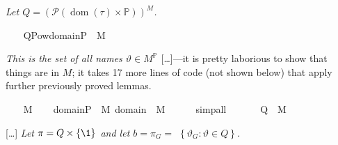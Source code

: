 \textit{Let
  $Q=(\mathcal{P}(\operatorname{dom}(\tau) \times
  \mathbb{P}))^{M}$.}
\begin{isabelle}
\ \ \isamarkupfalse%
\ {\isacharquery}{\kern0pt}Q{\isacharequal}{\kern0pt}{\isachardoublequoteopen}Pow{\isacharparenleft}{\kern0pt}domain{\isacharparenleft}{\kern0pt}{\isasymtau}{\isacharparenright}{\kern0pt}{\isasymtimes}P{\isacharparenright}{\kern0pt}\ {\isasyminter}\ M{\isachardoublequoteclose}
\end{isabelle}
\textit{This is the set of all names $\vartheta \in
  M^{\mathbb{P}}$} [\dots]---it is pretty laborious to show that things
are in $M$; it takes 17 more lines of code (not shown below) that
apply further previously proved lemmas.
\begin{isabelle}
\ \ \isamarkupfalse%
\ {\isacartoucheopen}{\isasymtau}{\isasymin}M{\isacartoucheclose}\isanewline
\ \ \isamarkupfalse%
\ {\isachardoublequoteopen}domain{\isacharparenleft}{\kern0pt}{\isasymtau}{\isacharparenright}{\kern0pt}{\isasymtimes}P\ {\isasymin}\ M{\isachardoublequoteclose}\ {\isachardoublequoteopen}domain{\isacharparenleft}{\kern0pt}{\isasymtau}{\isacharparenright}{\kern0pt}\ {\isasymin}\ M{\isachardoublequoteclose}\isanewline
\ \ \ \ \isamarkupfalse%
\ simp{\isacharunderscore}{\kern0pt}all\isanewline
\ \ \isamarkupfalse%
\isanewline
\ \ \isamarkupfalse%
\ {\isachardoublequoteopen}{\isacharquery}{\kern0pt}Q\ {\isasymin}\ M{\isachardoublequoteclose}
\end{isabelle}
[\dots]\textit{ Let $\pi=Q \times\{\1\}$ and let
  $b=\pi_{G}=$ $\left\{\vartheta_{G}: \vartheta \in Q\right\}$.}
